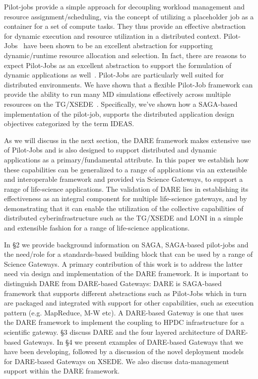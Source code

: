 \documentclass[]{svjour3}
\begin{document}

Pilot-jobs provide a simple approach for decoupling workload
management and resource assignment/scheduling, via the concept of
utilizing a placeholder job as a container for a set of compute tasks.
They thus provide an effective abstraction for dynamic execution and
resource utilization in a distributed context.
Pilot-Jobs~\cite{pstar11} have been shown to be an excellent
abstraction for supporting dynamic/runtime resource allocation and
selection.  In fact, there are reasons to expect Pilot-Jobs as an
excellent abstraction to support the formulation of dynamic
applications as well~\cite{pstar11}. Pilot-Jobs are particularly well
suited for distributed environments.  We have shown that a flexible
Pilot-Job framework can provide the ability to run many MD simulations
effectively across multiple resources on the
TG/XSEDE~\cite{saga-royalsoc,saga_bigjob_condor_cloud}.  Specifically,
we've shown how a SAGA-based implementation of the pilot-job, supports
the distributed application design objectives categorized by the term
IDEAS\cite{ideas}.

As we will discuss in the next section, the DARE framework makes
extensive use of Pilot-Jobs and is also designed to support
distributed and dynamic applications as a primary/fundamental
attribute.  In this paper we establish how these capabilities can be
generalized to a range of applications via an extensible and
interoperable framework and provided via Science Gateways, to support
a range of life-science applications.  The validation of DARE lies in
establishing its effectiveness as an integral component for multiple
life-science gateways, and by demonstrating that it can enable the
utilization of the collective capabilities of distributed
cyberinfrastructure such as the TG/XSEDE and LONI in a simple and
extensible fashion for a range of life-science applications.

In \S2 we provide background information on SAGA, SAGA-based
pilot-jobs and the need/role for a standards-based building block that
can be used by a range of Science Gateways.  A primary contribution of
this work is to address the latter need via design and implementation
of the DARE framework.  It is important to distinguish DARE from
DARE-based Gateways: DARE is SAGA-based framework that supports
different abstractions such as Pilot-Jobs which in turn are packaged
and integrated with support for other capabilities, such as execution
pattern (e.g. MapReduce, M-W etc). A DARE-based Gateway is one that
uses the DARE framework to implement the coupling to HPDC
infrastructure for a scientific gateway.  \S3 discuss DARE and the
four layered architecture of DARE-based Gateways. In \S4 we present
examples of DARE-based Gateways that we have been developing, followed
by a discussion of the novel deployment models for DARE-based Gateways
on XSEDE. We also discuss data-management support within the DARE
framework.
\end{document}
